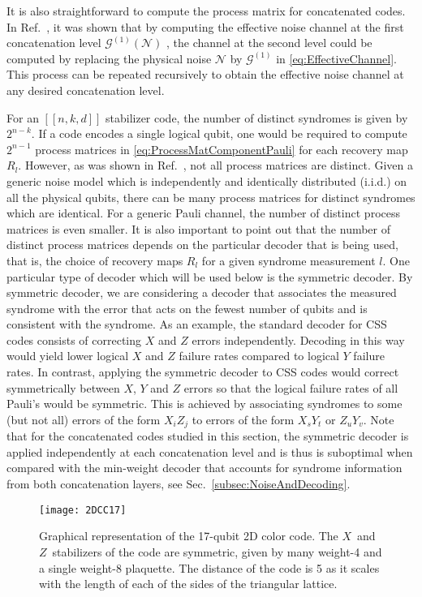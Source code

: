 \documentclass[pra,longbibliography,twocolumn,showpacs,nofootinbib,superscriptaddress,notitlepage]{revtex4-1}
\newcommand{\codepar}[1]{\ensuremath{[\![#1]\!]}}
\begin{document}
It is also straightforward to compute the process matrix for concatenated codes. In Ref.~\cite{RDM02}, it was shown that by computing the effective noise channel at the first concatenation level $\mathcal{G}^{(1)}(\mathcal{N})$ , the channel at the second level could be computed by replacing the physical noise $\mathcal{N}$ by $\mathcal{G}^{(1)}$ in \cref{eq:EffectiveChannel}. This process can be repeated recursively to obtain the effective noise channel at any desired concatenation level. 

For an $\codepar{n,k,d}$ stabilizer code, the number of distinct syndromes is given by $2^{n-k}$. If a code encodes a single logical qubit, one would be required to compute $2^{n-1}$ process matrices in \cref{eq:ProcessMatComponentPauli} for each recovery map $R_{l}$. However, as was shown in Ref.~\cite{CWBL16}, not all process matrices are distinct. Given a generic noise model which is independently and identically distributed (i.i.d.) on all the physical qubits, there can be many process matrices for distinct syndromes which are identical. For a generic Pauli channel, the number of distinct process matrices is even smaller. It is also important to point out that the number of distinct process matrices depends on the particular decoder that is being used, that is, the choice of recovery maps $R_{l}$ for a given syndrome measurement $l$. One particular type of decoder which will be used below is the symmetric decoder. By symmetric decoder, we are considering a decoder that associates the measured syndrome with the error that acts on the fewest number of qubits and is consistent with the syndrome. As an example, the standard decoder for CSS codes consists of correcting $X$ and $Z$ errors independently. Decoding in this way would yield lower logical $X$ and $Z$ failure rates compared to logical $Y$ failure rates. In contrast, applying the symmetric decoder to CSS codes would correct symmetrically between $X$, $Y$ and $Z$ errors so that the logical failure rates of all Pauli's would be symmetric. This is achieved by associating syndromes to some (but not all) errors of the form $X_{i}Z_{j}$ to errors of the form $X_{s}Y_{t}$ or $Z_{u}Y_{v}$.  Note that for the concatenated codes studied in this section, the symmetric decoder is applied independently at each concatenation level and is thus is suboptimal when compared with the min-weight decoder that accounts for syndrome information from both concatenation layers, see Sec.~\ref{subsec:NoiseAndDecoding}.

\begin{figure}
\centering
\texttt{[image: 2DCC17]}
\caption{Graphical representation of the 17-qubit 2D color code. The $X$~and $Z$~stabilizers of the code are symmetric, given by many weight-4 and a single weight-8 plaquette. The distance of the code is 5 as it scales with the length of each of the sides of the triangular lattice.}
\label{fig:2DCC17}
\end{figure}
\end{document}
